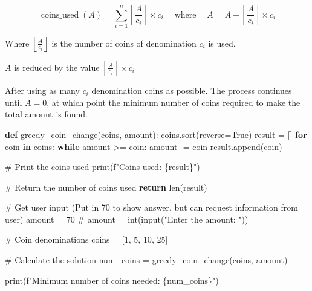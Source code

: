 \documentclass[
  letterpaper,
  DIV=11,
  numbers=noendperiod]{scrreprt}
\newenvironment{Shaded}{\begin{snugshade}}{\end{snugshade}}
\newcommand{\BuiltInTok}[1]{\textcolor[rgb]{0.00,0.23,0.31}{#1}}
\newcommand{\CommentTok}[1]{\textcolor[rgb]{0.37,0.37,0.37}{#1}}
\newcommand{\ControlFlowTok}[1]{\textcolor[rgb]{0.00,0.23,0.31}{\textbf{#1}}}
\newcommand{\DecValTok}[1]{\textcolor[rgb]{0.68,0.00,0.00}{#1}}
\newcommand{\KeywordTok}[1]{\textcolor[rgb]{0.00,0.23,0.31}{\textbf{#1}}}
\newcommand{\NormalTok}[1]{\textcolor[rgb]{0.00,0.23,0.31}{#1}}
\newcommand{\OperatorTok}[1]{\textcolor[rgb]{0.37,0.37,0.37}{#1}}
\newcommand{\SpecialCharTok}[1]{\textcolor[rgb]{0.37,0.37,0.37}{#1}}
\newcommand{\SpecialStringTok}[1]{\textcolor[rgb]{0.13,0.47,0.30}{#1}}
\newcommand{\VariableTok}[1]{\textcolor[rgb]{0.07,0.07,0.07}{#1}}
\begin{document}
\[\operatorname{coins\_used}(A) = \sum_{i=1}^{n} \left\lfloor \frac{A}{c_i} \right\rfloor \times c_i \quad \operatorname{where} \quad A = A - \left\lfloor \frac{A}{c_i} \right\rfloor \times c_i\]

Where \(\left\lfloor \frac{A}{c_i} \right\rfloor\) is the number of
coins of denomination \(c_i\) is used.

\(A\) is reduced by the value
\(\left\lfloor \frac{A}{c_i} \right\rfloor \times c_i\)

After using as many \(c_i\) denomination coins as possible. The process
continues until \(A=0\), at which point the minimum number of coins
required to make the total amount is found.

\begin{Shaded}
\begin{Highlighting}[]
\KeywordTok{def}\NormalTok{ greedy\_coin\_change(coins, amount):}
\NormalTok{    coins.sort(reverse}\OperatorTok{=}\VariableTok{True}\NormalTok{)}
\NormalTok{    result }\OperatorTok{=}\NormalTok{ []}
    \ControlFlowTok{for}\NormalTok{ coin }\KeywordTok{in}\NormalTok{ coins:}
        \ControlFlowTok{while}\NormalTok{ amount }\OperatorTok{\textgreater{}=}\NormalTok{ coin:}
\NormalTok{            amount }\OperatorTok{{-}=}\NormalTok{ coin}
\NormalTok{            result.append(coin)}
    
    \CommentTok{\# Print the coins used}
    \BuiltInTok{print}\NormalTok{(}\SpecialStringTok{f"Coins used: }\SpecialCharTok{\{}\NormalTok{result}\SpecialCharTok{\}}\SpecialStringTok{"}\NormalTok{)}
    
    \CommentTok{\# Return the number of coins used}
    \ControlFlowTok{return} \BuiltInTok{len}\NormalTok{(result)}

\CommentTok{\# Get user input (Put in 70 to show answer, but can request information from user)}
\NormalTok{amount }\OperatorTok{=} \DecValTok{70}
\CommentTok{\# amount = int(input("Enter the amount: "))}

\CommentTok{\# Coin denominations}
\NormalTok{coins }\OperatorTok{=}\NormalTok{ [}\DecValTok{1}\NormalTok{, }\DecValTok{5}\NormalTok{, }\DecValTok{10}\NormalTok{, }\DecValTok{25}\NormalTok{]}

\CommentTok{\# Calculate the solution}
\NormalTok{num\_coins }\OperatorTok{=}\NormalTok{ greedy\_coin\_change(coins, amount)}

\BuiltInTok{print}\NormalTok{(}\SpecialStringTok{f"Minimum number of coins needed: }\SpecialCharTok{\{}\NormalTok{num\_coins}\SpecialCharTok{\}}\SpecialStringTok{"}\NormalTok{)}
\end{Highlighting}
\end{Shaded}
\end{document}
